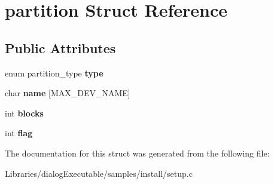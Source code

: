 \hypertarget{structpartition}{}\section{partition Struct Reference}
\label{structpartition}
\subsection*{Public Attributes}
\begin{DoxyCompactItemize}
\item 
enum partition\+\_\+type {\bfseries type}\hypertarget{structpartition_a33203c67b7c221b5020140c2ddd22b0c}{}\label{structpartition_a33203c67b7c221b5020140c2ddd22b0c}

\item 
char {\bfseries name} \mbox{[}M\+A\+X\+\_\+\+D\+E\+V\+\_\+\+N\+A\+ME\mbox{]}\hypertarget{structpartition_aefa151e4e3e241d9f0b55936df80c650}{}\label{structpartition_aefa151e4e3e241d9f0b55936df80c650}

\item 
int {\bfseries blocks}\hypertarget{structpartition_a5c3b3d34417f8938be525b38ee96d8f4}{}\label{structpartition_a5c3b3d34417f8938be525b38ee96d8f4}

\item 
int {\bfseries flag}\hypertarget{structpartition_a87308f36e72dadd945c6223993808c24}{}\label{structpartition_a87308f36e72dadd945c6223993808c24}

\end{DoxyCompactItemize}


The documentation for this struct was generated from the following file\+:\begin{DoxyCompactItemize}
\item 
Libraries/dialog\+Executable/samples/install/setup.\+c\end{DoxyCompactItemize}
